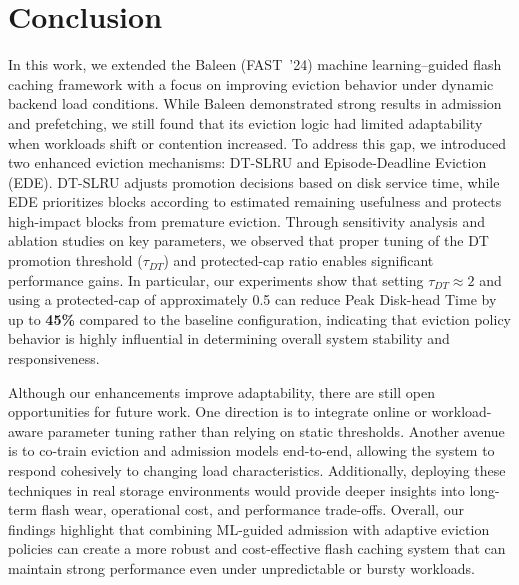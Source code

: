 \section{Conclusion}
In this work, we extended the Baleen (FAST~'24) machine learning–guided flash caching framework with a focus on improving eviction behavior under dynamic backend load conditions. While Baleen demonstrated strong results in admission and prefetching, we still found that its eviction logic had limited adaptability when workloads shift or contention increased. To address this gap, we introduced two enhanced eviction mechanisms: DT-SLRU and Episode-Deadline Eviction (EDE). DT-SLRU adjusts promotion decisions based on disk service time, while EDE prioritizes blocks according to estimated remaining usefulness and protects high-impact blocks from premature eviction. Through sensitivity analysis and ablation studies on key parameters, we observed that proper tuning of the DT promotion threshold ($\tau_{DT}$) and protected-cap ratio enables significant performance gains. In particular, our experiments show that setting $\tau_{DT} \approx 2$ and using a protected-cap of approximately 0.5 can reduce Peak Disk-head Time by up to \textbf{45\%} compared to the baseline configuration, indicating that eviction policy behavior is highly influential in determining overall system stability and responsiveness.

Although our enhancements improve adaptability, there are still open opportunities for future work. One direction is to integrate online or workload-aware parameter tuning rather than relying on static thresholds. Another avenue is to co-train eviction and admission models end-to-end, allowing the system to respond cohesively to changing load characteristics. Additionally, deploying these techniques in real storage environments would provide deeper insights into long-term flash wear, operational cost, and performance trade-offs. Overall, our findings highlight that combining ML-guided admission with adaptive eviction policies can create a more robust and cost-effective flash caching system that can maintain strong performance even under unpredictable or bursty workloads.
